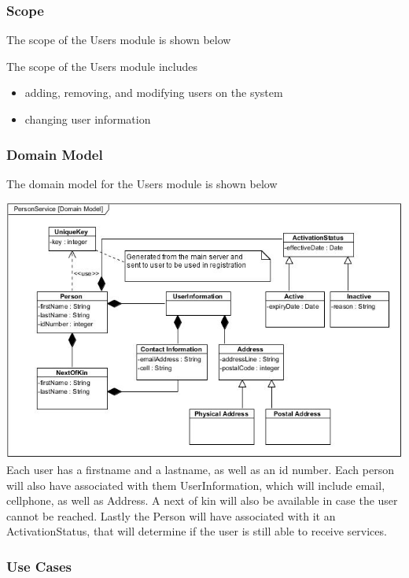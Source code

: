 \documentclass[a4paper,12pt]{article}
\begin{document}
	\subsubsection{Scope}
	The scope of the Users module is shown below
	
	
	{\noindent}The scope of the Users module includes
	\begin{itemize}
		\item adding, removing, and modifying users on the system
		\item changing user information
	\end{itemize}
	
	\subsubsection{Domain Model}
	The domain model for the Users module is shown below
	
	\includegraphics[width=1\textwidth]{./Pictures/UML/PersonServiceDomain.jpg}\\[1.5cm]	

	{\noindent}Each user has a firstname and a lastname, as well as an id number. Each person will also have associated with them UserInformation, which will include email, cellphone, as well as Address. A next of kin will also be available in case the user cannot be reached. Lastly the Person will have associated with it an ActivationStatus, that will determine if the user is still able to receive services.	
	 
	\newpage
	\subsubsection{Use Cases}
	
\end{document}
